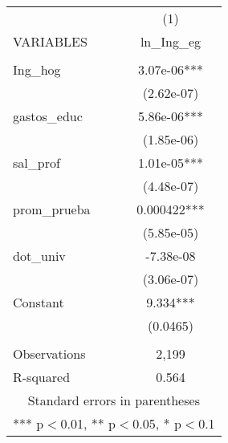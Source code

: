 \documentclass[]{article}
\begin{document}
\begin{tabular}{lc} \hline
 & (1) \\
VARIABLES & ln\_Ing\_eg \\ \hline
 &  \\
Ing\_hog & 3.07e-06*** \\
 & (2.62e-07) \\
gastos\_educ & 5.86e-06*** \\
 & (1.85e-06) \\
sal\_prof & 1.01e-05*** \\
 & (4.48e-07) \\
prom\_prueba & 0.000422*** \\
 & (5.85e-05) \\
dot\_univ & -7.38e-08 \\
 & (3.06e-07) \\
Constant & 9.334*** \\
 & (0.0465) \\
 &  \\
Observations & 2,199 \\
 R-squared & 0.564 \\ \hline
\multicolumn{2}{c}{ Standard errors in parentheses} \\
\multicolumn{2}{c}{ *** p$<$0.01, ** p$<$0.05, * p$<$0.1} \\
\end{tabular}
\end{document}
